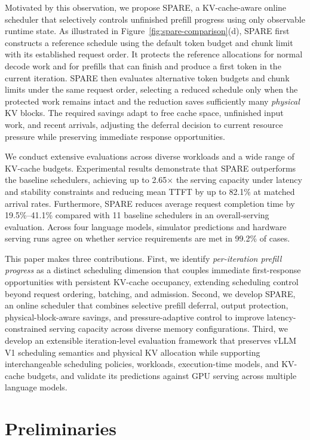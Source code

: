 \documentclass[sigconf,anonymous,review]{acmart}
\begin{document}
Motivated by this observation, we propose SPARE, a KV-cache-aware online scheduler that selectively controls unfinished prefill progress using only observable runtime state. As illustrated in Figure~\ref{fig:spare-comparison}(d), SPARE first constructs a reference schedule using the default token budget and chunk limit with its established request order. It protects the reference allocations for normal decode work and for prefills that can finish and produce a first token in the current iteration. SPARE then evaluates alternative token budgets and chunk limits under the same request order, selecting a reduced schedule only when the protected work remains intact and the reduction saves sufficiently many \emph{physical} KV blocks. The required savings adapt to free cache space, unfinished input work, and recent arrivals, adjusting the deferral decision to current resource pressure while preserving immediate response opportunities.

We conduct extensive evaluations across diverse workloads and a wide range of KV-cache budgets. Experimental results demonstrate that SPARE outperforms the baseline schedulers, achieving up to 2.65$\times$ the serving capacity under latency and stability constraints and reducing mean TTFT by up to 82.1\% at matched arrival rates. Furthermore, SPARE reduces average request completion time by 19.5\%--41.1\% compared with 11 baseline schedulers in an overall-serving evaluation. Across four language models, simulator predictions and hardware serving runs agree on whether service requirements are met in 99.2\% of cases.

This paper makes three contributions. First, we identify \emph{per-iteration prefill progress} as a distinct scheduling dimension that couples immediate first-response opportunities with persistent KV-cache occupancy, extending scheduling control beyond request ordering, batching, and admission. Second, we develop SPARE, an online scheduler that combines selective prefill deferral, output protection, physical-block-aware savings, and pressure-adaptive control to improve latency-constrained serving capacity across diverse memory configurations. Third, we develop an extensible iteration-level evaluation framework that preserves vLLM V1 scheduling semantics and physical KV allocation while supporting interchangeable scheduling policies, workloads, execution-time models, and KV-cache budgets, and validate its predictions against GPU serving across multiple language models.


\section{Preliminaries}
\label{sec:preliminaries}
\end{document}
